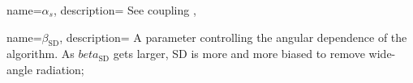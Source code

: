 


{
  name=\ensuremath{\alpha_s},
  description={
      See coupling
  },
}







{
    name=\ensuremath{\beta_\text{SD}},
    description={
        A parameter controlling the angular dependence of the  algorithm.
        As \(beta_\text{SD}\) gets larger, SD is more and more biased to remove wide-angle radiation;
    }
}





